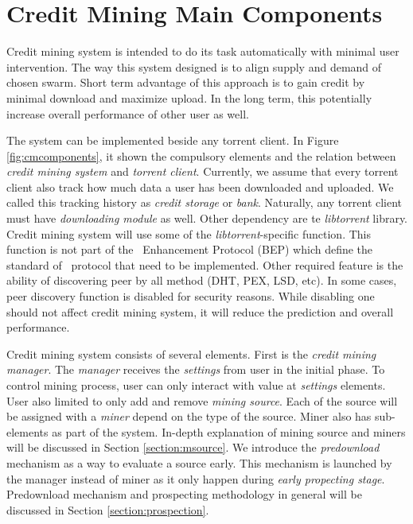 \section{Credit Mining Main Components}
\label{section:cmcomponents}

Credit mining system is intended to do its task automatically with minimal user intervention. The way this system designed is to align supply and demand of chosen swarm. Short term advantage of this approach is to gain credit by minimal download and maximize upload. In the long term, this potentially increase overall performance of other user as well.

The system can be implemented beside any torrent client. In Figure \ref{fig:cmcomponents}, it shown the compulsory elements and the relation between \textit{credit mining system} and \textit{torrent client}. Currently, we assume that every torrent client also track how much data a user has been downloaded and uploaded. We called this tracking history as \textit{credit storage} or \textit{bank}. Naturally, any torrent client must have \textit{downloading module} as well. Other dependency are te \textit{libtorrent} library. Credit mining system will use some of the \textit{libtorrent}-specific function. This function is not part of the \bt~Enhancement Protocol (BEP) which define the standard of \bt~protocol that need to be implemented. Other required feature is the ability of discovering peer by all method (DHT, PEX, LSD, etc). In some cases, peer discovery function is disabled for security reasons. While disabling one should not affect credit mining system, it will reduce the prediction and overall performance.

Credit mining system consists of several elements. First is the \textit{credit mining manager}. The \textit{manager} receives the \textit{settings} from user in the initial phase. To control mining process, user can only interact with value at \textit{settings} elements. User also limited to only add and remove \textit{mining source}. Each of the source will be assigned with a \textit{miner} depend on the type of the source. Miner also has sub-elements as part of the system. In-depth explanation of mining source and miners will be discussed in Section \ref{section:msource}. We introduce the \textit{predownload} mechanism as a way to evaluate a source early. This mechanism is launched by the manager instead of miner as it only happen during \textit{early propecting stage}. Predownload mechanism and prospecting methodology in general will be discussed in Section \ref{section:prospection}.

